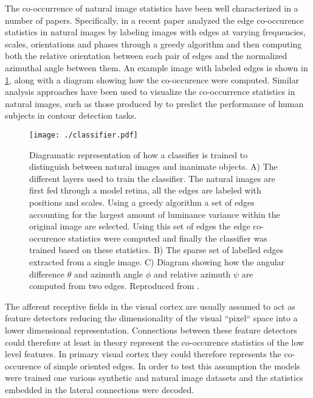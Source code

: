 The co-occurrence of natural image statistics have been well
characterized in a number of papers. Specifically, in a recent paper
\cite{Perrinet2015} analyzed the edge co-occurence statistics in
natural images by labeling images with edges at varying frequencies,
scales, orientations and phases through a greedy algorithm and then
computing both the relative orientation between each pair of edges and
the normalized azimuthal angle between them. An example image with
labeled edges is shown in \ref{classifier}, along with a diagram
showing how the co-occurence were computed. Similar analysis
approaches have been used to visualize the co-occurrence statistics in
natural images, such as those produced by \cite{Geisler2001} to
predict the performance of human subjects in contour detection tasks.

\begin{figure}
	\centering
    \texttt{[image: ./classifier.pdf]}
	\caption[] {Diagramatic representation of how a classifier is
      trained to distinguish between natural images and inanimate
      objects. A) The different layers used to train the
      classifier. The natural images are first fed through a model
      retina, all the edges are labeled with positions and
      scales. Using a greedy algorithm a set of edges accounting for
      the largest amount of luminance variance within the original
      image are selected. Using this set of edges the edge
      co-occurence statistics were computed and finally the classifier
      was trained based on these statistics. B) The sparse set
      of labelled edges extracted from a single image. C) Diagram
      showing how the angular difference $\theta$ and azimuth angle
      $\phi$ and relative azimuth $\psi$ are computed from two
      edges. Reproduced from \cite{Perrinet2015}.}
	\label{classifier}
\end{figure}

The afferent receptive fields in the visual cortex are usually assumed
to act as feature detectors reducing the dimensionality of the visual
``pixel`` space into a lower dimensional representation. Connections
between these feature detectors could therefore at least in theory
represent the co-occurence statistics of the low level features. In
primary visual cortex they could therefore represents the co-occurence
of simple oriented edges. In order to test this assumption the models
were trained one various synthetic and natural image datasets and the
statistics embedded in the lateral connections were decoded.

